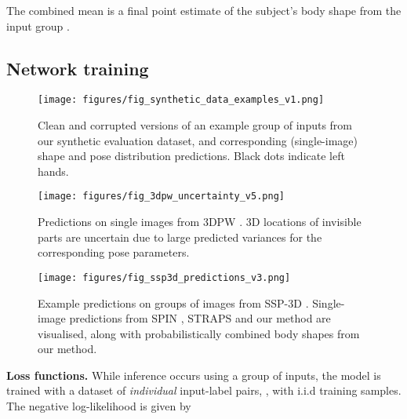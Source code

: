 \documentclass[final]{cvpr}
\begin{document}
The combined mean  is a final point estimate of the subject's body shape from the input group .

\vspace{-0.05cm}
\subsection{Network training}
\label{subsec:network_training}

\begin{figure}[t]
    \centering
    \texttt{[image: figures/fig\_synthetic\_data\_examples\_v1.png]}
    \caption{Clean and corrupted versions of an example group of inputs from our synthetic evaluation dataset, and corresponding (single-image) shape and pose distribution predictions. Black dots indicate left hands.}
    \label{fig:synthtic_data_example_predictions}
    \vspace{-0.3cm}
\end{figure}

\begin{figure}[t]
    \centering
    \texttt{[image: figures/fig\_3dpw\_uncertainty\_v5.png]}
    \caption{Predictions on single images from 3DPW \cite{vonMarcard2018}. 3D locations of invisible parts are uncertain due to large predicted variances for the corresponding pose parameters.}
    \label{fig:3dpw_uncertainty}
    \vspace{-0.4cm}
\end{figure}

\begin{figure}[t]
    \centering
    \texttt{[image: figures/fig\_ssp3d\_predictions\_v3.png]}
    \caption{Example predictions on groups of images from SSP-3D \cite{STRAPS2020BMVC}. Single-image predictions from SPIN \cite{kolotouros2019spin}, STRAPS \cite{STRAPS2020BMVC} and our method are visualised, along with probabilistically combined body shapes from our method.}
    \label{fig:ssp3d_predictions}
    \vspace{-0.4cm}
\end{figure}

\noindent \textbf{Loss functions.} While inference occurs using a group of inputs, the model is trained with a dataset of \textit{individual} input-label pairs, , with  i.i.d training samples. The negative log-likelihood is given by 
\end{document}
